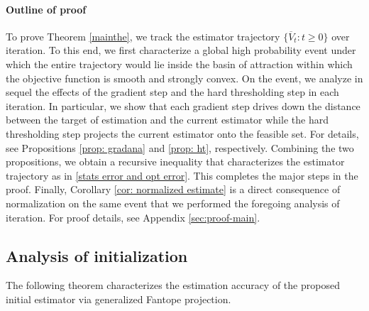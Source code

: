 \documentclass[11pt]{article}
\newcommand{\0}{{\mathbf{0}}}
\begin{document}
\paragraph{Outline of proof}
To prove Theorem \ref{mainthe}, we track the estimator trajectory $\{\overline{V}_t: t\geq 0\}$ over iteration.
To this end, we first characterize a global high probability event under which the entire trajectory would lie inside the basin of attraction within which the objective function is smooth and strongly convex.
On the event, we analyze in sequel the effects of the gradient step and the hard thresholding step in each iteration. 
In particular, 
we show that each gradient step drives down the distance between the target of estimation and the current estimator while the hard thresholding step projects the current estimator onto the feasible set. 
For details, see Propositions \ref{prop: gradana} and \ref{prop: ht}, respectively.
Combining the two propositions, we obtain a recursive inequality that characterizes the estimator trajectory as in \eqref{stats error and opt error}.
This completes the major steps in the proof. 
Finally, 
Corollary \ref{cor: normalized estimate} is a direct consequence of normalization on the same event that we performed the foregoing analysis of iteration. 
For proof details, see Appendix \ref{sec:proof-main}.







\subsection{Analysis of initialization} 
The following theorem characterizes the estimation accuracy of the proposed initial estimator via generalized Fantope projection.
\end{document}
